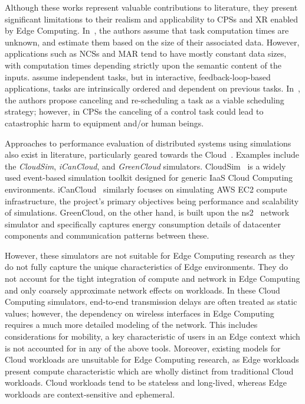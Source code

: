 Although these works represent valuable contributions to literature, they present significant limitations to their realism and applicability to \glspl{CPS} and \gls{XR} enabled by Edge Computing.
In~\cite{chen2015efficient,champati2016semi}, the authors assume that task computation times are unknown, and estimate them based on the size of their associated data.
However, applications such as \glspl{NCS} and \gls{MAR} tend to have mostly constant data sizes, with computation times depending strictly upon the semantic content of the inputs.\@
\cite{champati2016semi,al2017reliable} assume independent tasks, but in interactive, feedback-loop-based applications, tasks are intrinsically ordered and dependent on previous tasks.
In~\cite{champati2015one}, the authors propose canceling and re-scheduling a task as a viable scheduling strategy; however, in \glspl{CPS} the canceling of a control task could lead to catastrophic harm to equipment and/or human beings.

Approaches to performance evaluation of distributed systems using simulations also exist in literature, particularly geared towards the Cloud~\cite{mansouri2020cloud}.
Examples include the \emph{CloudSim}, \emph{iCanCloud}, and \emph{GreenCloud} simulators.
CloudSim~\cite{calheiros2011cloudsim} is a widely used event-based simulation toolkit designed for generic \gls{IaaS} Cloud Computing environments.
iCanCloud~\cite{nunez2012icancloud} similarly focuses on simulating \gls{AWS} \gls{EC2} compute infrastructure, the project's primary objectives being performance and scalability of simulations.
GreenCloud, on the other hand, is built upon the \acs{ns2}~\cite{nsnam} network simulator and specifically captures energy consumption details of datacenter components and communication patterns between these.

However, these simulators are not suitable for Edge Computing research as they do not fully capture the unique characteristics of Edge environments.
They do not account for the tight integration of compute and network in Edge Computing and only coarsely approximate network effects on workloads.
In these Cloud Computing simulators, end-to-end transmission delays are often treated as static values;
however, the dependency on wireless interfaces in Edge Computing requires a much more detailed modeling of the network.
This includes considerations for mobility, a key characteristic of users in an Edge context which is not accounted for in any of the above tools.
Moreover, existing models for Cloud workloads are unsuitable for Edge Computing research, as Edge workloads present compute characteristic which are wholly distinct from traditional Cloud workloads.
Cloud workloads tend to be stateless and long-lived, whereas Edge workloads are context-sensitive and ephemeral.

